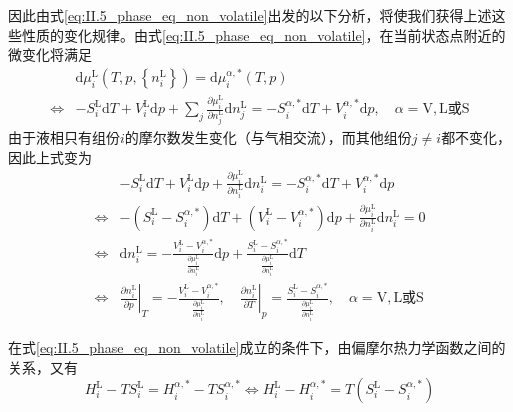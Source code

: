 \documentclass[main.tex]{subfiles}
\begin{document}
因此由式\eqref{eq:II.5_phase_eq_non_volatile}出发的以下分析，将使我们获得上述这些性质的变化规律。由式\eqref{eq:II.5_phase_eq_non_volatile}，在当前状态点附近的微变化将满足
\begin{align*}
                    & \mathrm{d}\mu_i^\text{L}\left(T,p,\left\{n_i^\text{L}\right\}\right)=\mathrm{d}\mu_i^{\alpha,*}\left(T,p\right)                                                                                                         \\
    \Leftrightarrow & -S_i^\text{L}\mathrm{d}T+V_i^\text{L}\mathrm{d}p+\sum_j\frac{\partial \mu_i^\text{L}}{\partial n_j^\text{L}}\mathrm{d}n_j^\text{L}=-S_i^{\alpha,*}\mathrm{d}T+V_i^{\alpha,*}\mathrm{d}p,\quad\alpha=\text{V},\text{L或S}
\end{align*}
由于液相只有组份$i$的摩尔数发生变化（与气相交流），而其他组份$j\neq i$都不变化，因此上式变为
\begin{align*}
                    & -S_i^\text{L}\mathrm{d}T+V_i^\text{L}\mathrm{d}p+\frac{\partial\mu_i^\text{L}}{\partial n_i^\text{L}}\mathrm{d}n_i^\text{L}=-S_i^{\alpha,*}\mathrm{d}T+V_i^{\alpha,*}\mathrm{d}p                                                                                                                                                             \\
    \Leftrightarrow & -\left(S_i^\text{L}-S_i^{\alpha,*}\right)\mathrm{d}T+\left(V_i^\text{L}-V_i^{\alpha,*}\right)\mathrm{d}p+\frac{\partial \mu_i^\text{L}}{\partial n_i^\text{L}}\mathrm{d}n_i^\text{L}=0                                                                                                                                                       \\
    \Leftrightarrow & \mathrm{d}n_i^\text{L}=-\frac{V_i^\text{L}-V_i^{\alpha,*}}{\frac{\partial\mu_i^\text{L}}{\partial n_i^\text{L}}}\mathrm{d}p+\frac{S_i^\text{L}-S_i^{\alpha,*}}{\frac{\partial\mu_i^\text{L}}{\partial n_i^\text{L}}} \mathrm{d}T                                                                                                             \\
    \Leftrightarrow & \left.\frac{\partial n_i^\text{L}}{\partial p}\right|_{T}=-\frac{V_i^\text{L}-V_i^{\alpha,*}}{\frac{\partial \mu_i^\text{L}}{\partial n_i^\text{L}}},\quad\left.\frac{\partial n_i^\text{L}}{\partial T}\right|_{p}=\frac{S_i^\text{L}-S_i^{\alpha,*}}{\frac{\partial\mu_i^\text{L}}{\partial n_i^\text{L}}},\quad\alpha=\text{V},\text{L或S}
\end{align*}

在式\eqref{eq:II.5_phase_eq_non_volatile}成立的条件下，由偏摩尔热力学函数之间的关系，又有
\[H_i^\text{L}-TS_i^\text{L}=H_i^{\alpha,*}-TS_i^{\alpha,*}\Leftrightarrow H_i^\text{L}-H_i^{\alpha,*}=T\left(S_i^\text{L}-S_i^{\alpha,*}\right)\]
\end{document}
